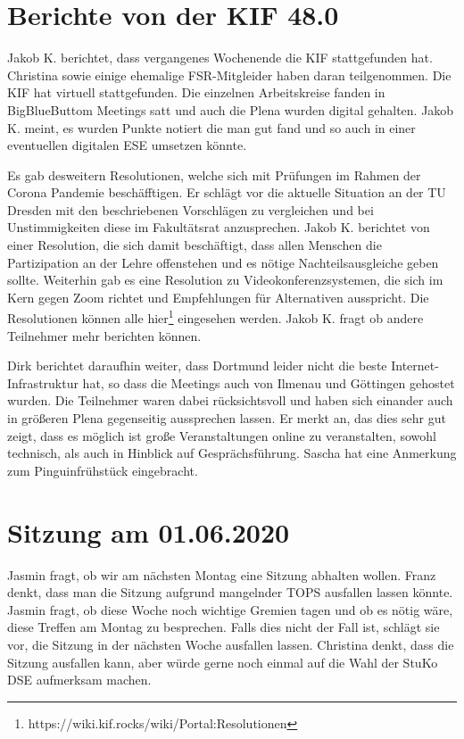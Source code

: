 \documentclass{fsrprotokoll}
\begin{document}
\section{Berichte von der KIF 48.0}
Jakob K. berichtet, dass vergangenes Wochenende die KIF stattgefunden hat. Christina sowie einige ehemalige FSR-Mitgleider haben daran teilgenommen. Die KIF hat virtuell stattgefunden. Die einzelnen Arbeitskreise fanden in BigBlueButtom Meetings satt und auch die Plena wurden digital gehalten.
Jakob K. meint, es wurden Punkte notiert die man gut fand und so auch in einer eventuellen digitalen ESE umsetzen könnte.

Es gab desweitern Resolutionen, welche sich mit Prüfungen im Rahmen der Corona Pandemie beschäfftigen. Er schlägt vor die aktuelle Situation an der TU Dresden mit den beschriebenen Vorschlägen zu vergleichen und bei Unstimmigkeiten diese im Fakultätsrat anzusprechen.
Jakob K. berichtet von einer Resolution, die sich damit beschäftigt, dass allen Menschen die Partizipation an der Lehre offenstehen und es nötige Nachteilsausgleiche geben sollte.
Weiterhin gab es eine Resolution zu Videokonferenzsystemen, die sich im Kern gegen Zoom richtet und Empfehlungen für Alternativen ausspricht.
Die Resolutionen können alle hier\footnote{https://wiki.kif.rocks/wiki/Portal:Resolutionen} eingesehen werden.
Jakob K. fragt ob andere Teilnehmer mehr berichten können.

Dirk berichtet daraufhin weiter, dass Dortmund leider nicht die beste Internet-Infrastruktur hat, so dass die Meetings auch von Ilmenau und Göttingen gehostet wurden. Die Teilnehmer waren dabei rücksichtsvoll und haben sich einander auch in größeren Plena gegenseitig aussprechen lassen.
Er merkt an, das dies sehr gut zeigt, dass es möglich ist große Veranstaltungen online zu veranstalten, sowohl technisch, als auch in Hinblick auf Gesprächsführung.
Sascha hat eine Anmerkung zum Pinguinfrühstück eingebracht.

\section{Sitzung am 01.06.2020}
Jasmin fragt, ob wir am nächsten Montag eine Sitzung abhalten wollen. Franz denkt, dass man die Sitzung aufgrund mangelnder TOPS ausfallen lassen könnte.
Jasmin fragt, ob diese Woche noch wichtige Gremien tagen und ob es nötig wäre, diese Treffen am Montag zu besprechen. Falls dies nicht der Fall ist, schlägt sie vor, die Sitzung in der nächsten Woche ausfallen lassen.
Christina denkt, dass die Sitzung ausfallen kann, aber würde gerne noch einmal auf die Wahl der StuKo DSE aufmerksam machen.
\end{document}

